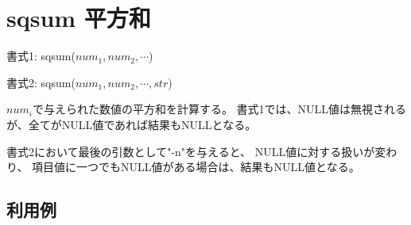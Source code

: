 
%

\section{sqsum 平方和\label{sect:sqsum}}

書式1: sqsum($num_1,num_2,\cdots$)

書式2: sqsum($num_1,num_2,\cdots,str$)

$num_i$で与えられた数値の平方和を計算する。
書式1では、NULL値は無視されるが、全てがNULL値であれば結果もNULLとなる。

書式2において最後の引数として"-n"を与えると、
NULL値に対する扱いが変わり、
項目値に一つでもNULL値がある場合は、結果もNULL値となる。

\subsection*{利用例}


%

